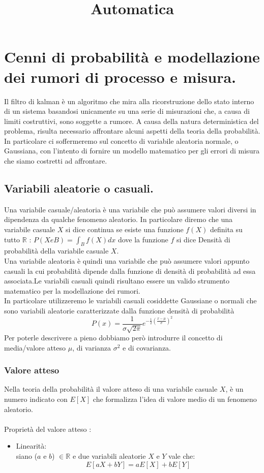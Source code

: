 \documentclass[12pt,a4paper]{article}
\title{Automatica}
\begin{document}
\section{Cenni di probabilità e modellazione dei rumori di processo e misura.}

Il filtro di kalman è un algoritmo che mira alla ricorstruzione dello stato interno di un sistema basandosi unicamente su una serie di misurazioni che, a causa di limiti costruttivi, sono soggette a rumore.
A causa della natura deterministica del problema, risulta necessario affrontare alcuni aspetti della teoria della probabilità. In particolare ci soffermeremo sul concetto di variabile aleatoria normale, o Gaussiana, con l’intento di fornire un modello matematico per gli errori di misura che siamo costretti ad affrontare.

\subsection{Variabili aleatorie o casuali.}

Una variabile casuale/aleatoria è una variabile che può assumere valori diversi in dipendenza da qualche fenomeno aleatorio.
In particolare diremo che una variabile casuale $X$ si dice continua se esiste una funzione $f(X)$ definita su tutto $\mathbb{R}$ : $P(X e B) = \int_B f(X) dx$ dove la funzione $f$ si dice Densità di probabilità della variabile casuale $X$.\\
Una variabile aleatoria è quindi una variabile che può assumere valori appunto casuali la cui probabilità dipende dalla funzione di densità di probabilità ad essa associata.Le variabili casuali quindi risultano essere un valido strumento matematico per la modellazione dei rumori.\\
In particolare utilizzeremo le variabili casuali cosiddette Gaussiane o normali che sono variabili aleatorie caratterizzate dalla funzione densità di probabilità \[P(x) = \frac{1}{{\sigma \sqrt {2\pi } }}e^{-\frac{1}{2}{(\frac{x-\mu}{\sigma})}^2}\] Per poterle descrivere a pieno dobbiamo però introdurre il concetto di media/valore atteso $\mu$, di varianza $\sigma^2$ e di covarianza.

\subsubsection{Valore atteso}

Nella teoria della probabilità il valore atteso di una variabile casuale $X$, è un numero indicato con $E[X]$ che formalizza l'idea di valore medio di un fenomeno aleatorio.\\\\
Proprietà del valore atteso :
\begin{itemize}
\item Linearità: \\ siano ($a$ e $b$) $\in \mathbb{R}$ e due variabili aleatorie $X$ e $Y$ vale che: \[E[aX + bY] = aE[X] + bE[Y]\]
\end{itemize}
\end{document}
